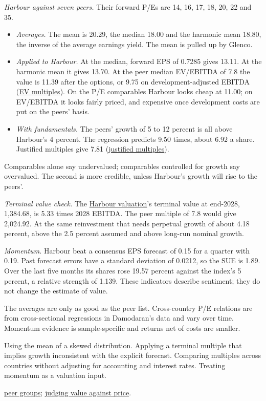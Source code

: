\begin{qfmethod}
 \emph{Harbour against seven peers.} Their forward P/Es are 14, 16, 17, 18, 20, 22 and 35.
\begin{itemize}
\item \emph{Averages.} The mean is 20.29, the median 18.00 and the harmonic mean 18.80, the inverse of the average earnings yield. The mean is pulled up by Glenco.
\item \emph{Applied to Harbour.} At the median, forward EPS of 0.7285 gives 13.11. At the harmonic mean it gives 13.70. At the peer median EV/EBITDA of 7.8 the value is 11.39 after the options, or 9.75 on development-adjusted EBITDA (\hyperref[meth:enterprise-value-multiples]{EV multiples}). On the P/E comparables Harbour looks cheap at 11.00; on EV/EBITDA it looks fairly priced, and expensive once development costs are put on the peers' basis.
\item \emph{With fundamentals.} The peers' growth of 5 to 12 percent is all above Harbour's 4 percent. The regression predicts 9.50 times, about 6.92 a share. Justified multiples give 7.81 (\hyperref[meth:justified-multiples]{justified multiples}).
\end{itemize}
Comparables alone say undervalued; comparables controlled for growth say overvalued. The second is more credible, unless Harbour's growth will rise to the peers'.

\emph{Terminal value check.} The \hyperref[meth:forecast-horizon-steady-state]{Harbour valuation}'s terminal value at end-2028, 1,384.68, is 5.33 times 2028 EBITDA. The peer multiple of 7.8 would give 2,024.92. At the same reinvestment that needs perpetual growth of about 4.18 percent, above the 2.5 percent assumed and above long-run nominal growth.

\emph{Momentum.} Harbour beat a consensus EPS forecast of 0.15 for a quarter with 0.19. Past forecast errors have a standard deviation of 0.0212, so the SUE is 1.89. Over the last five months its shares rose 19.57 percent against the index's 5 percent, a relative strength of 1.139. These indicators describe sentiment; they do not change the estimate of value.

 The averages are only as good as the peer list. Cross-country P/E relations are from cross-sectional regressions in Damodaran's data and vary over time. Momentum evidence is sample-specific and returns net of costs are smaller.

 Using the mean of a skewed distribution. Applying a terminal multiple that implies growth inconsistent with the explicit forecast. Comparing multiples across countries without adjusting for accounting and interest rates. Treating momentum as a valuation input.

 \hyperref[meth:peer-group-selection]{peer groups}; \hyperref[meth:valuation-price-judgement]{judging value against price}.

\end{qfmethod}
